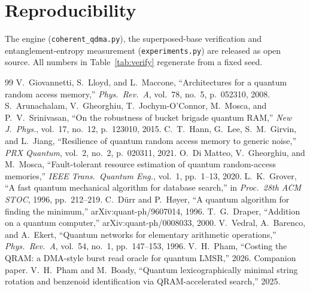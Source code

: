 \documentclass[11pt]{article}
\theoremstyle{definition}
\begin{document}
\section*{Reproducibility}
The engine (\texttt{coherent\_qdma.py}), the superposed-base verification and
entanglement-entropy measurement (\texttt{experiments.py}) are released as open
source. All numbers in Table~\ref{tab:verify} regenerate from a fixed seed.

\begin{thebibliography}{99}
 V.~Giovannetti, S.~Lloyd, and L.~Maccone,
  ``Architectures for a quantum random access memory,'' \emph{Phys.\ Rev.\ A},
  vol.~78, no.~5, p.~052310, 2008.
 S.~Arunachalam, V.~Gheorghiu,
  T.~Jochym-O'Connor, M.~Mosca, and P.~V.~Srinivasan, ``On the robustness of
  bucket brigade quantum RAM,'' \emph{New J.\ Phys.}, vol.~17, no.~12, p.~123010, 2015.
 C.~T.~Hann, G.~Lee, S.~M.~Girvin, and L.~Jiang,
  ``Resilience of quantum random access memory to generic noise,'' \emph{PRX
  Quantum}, vol.~2, no.~2, p.~020311, 2021.
 O.~Di Matteo, V.~Gheorghiu, and M.~Mosca,
  ``Fault-tolerant resource estimation of quantum random-access memories,''
  \emph{IEEE Trans.\ Quantum Eng.}, vol.~1, pp.~1--13, 2020.
 L.~K.~Grover, ``A fast quantum mechanical algorithm for
  database search,'' in \emph{Proc.\ 28th ACM STOC}, 1996, pp.~212--219.
 C.~D\"urr and P.~H\o yer, ``A quantum algorithm for
  finding the minimum,'' arXiv:quant-ph/9607014, 1996.
 T.~G.~Draper, ``Addition on a quantum computer,''
  arXiv:quant-ph/0008033, 2000.
 V.~Vedral, A.~Barenco, and A.~Ekert, ``Quantum
  networks for elementary arithmetic operations,'' \emph{Phys.\ Rev.\ A}, vol.~54,
  no.~1, pp.~147--153, 1996.
 V.~H.~Pham, ``Costing the QRAM: a DMA-style burst read
  oracle for quantum LMSR,'' 2026. Companion paper.
 V.~H.~Pham and M.~Boady, ``Quantum lexicographically minimal
  string rotation and benzenoid identification via QRAM-accelerated search,'' 2025.
\end{thebibliography}
\end{document}
